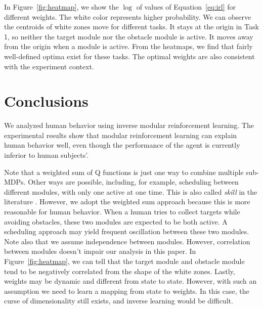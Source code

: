 In Figure~\ref{fig:heatmap}, we show the $\log$ of values of
Equation~\ref{eq:irl} for different weights. The white color represents higher
probability. We can observe the centroids of white zones move for different
tasks. It stays at the origin in Task 1, so neither the target module nor the
obstacle module is active. It moves away from the origin when a module is
active.  From the heatmaps, we find that fairly well-defined optima exist for
these tasks. The optimal weights are also consistent with the experiment
context.

\section{Conclusions}
\label{sec:conclude}

We analyzed human behavior using inverse modular reinforcement learning. The
experimental results show that modular reinforcement learning can explain human
behavior well, even though the performance of the agent is currently inferior to
human subjects'.

Note that a weighted sum of Q functions is just one way to combine multiple
sub-MDPs. Other ways are possible, including, for example, scheduling between
different modules, with only one active at one time. This is also called {\em
skill} in the literature \cite{konidaris2009skill}. However, we adopt the
weighted sum approach because this is more reasonable for human behavior. When a
human tries to collect targets while avoiding obstacles, these two modules are
expected to be both active. A scheduling approach may yield frequent oscillation
between these two modules. Note also that we assume independence between
modules. However, correlation between modules doesn't impair our analysis in
this paper. In Figure~\ref{fig:heatmap}, we can tell that the target module and
obstacle module tend to be negatively correlated from the shape of the white
zones. Lastly, weights may be dynamic and different from state to state.
However, with such an assumption we need to learn a mapping from state to
weights. In this case, the curse of dimensionality still exists, and inverse
learning would be difficult.
